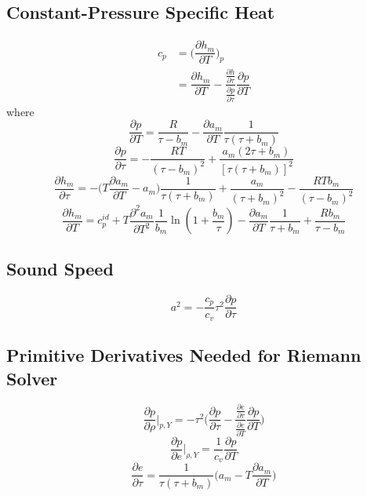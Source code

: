 \subsection{Constant-Pressure Specific Heat}
\begin{equation}
\begin{split}
c_p &= \biggl(\dfrac{\partial h_m}{\partial T}\biggr)_{p} \\
&= \dfrac{\partial h_m}{\partial T} - \dfrac{\tfrac{\partial h}{\partial \tau}}{\tfrac{\partial p}{\partial \tau}}\dfrac{\partial p}{\partial T}
\end{split}
\end{equation}
where
\begin{equation}
\frac{\partial p}{\partial T}=\frac{R}{\tau-b_m}-\frac{\partial a_m}{\partial T}\frac{1}{\tau(\tau+b_m)}
\end{equation}
\begin{equation}
\frac{\partial p}{\partial \tau}=-\frac{RT}{(\tau-b_m)^2}+\frac{a_m(2\tau+b_m)}{[\tau(\tau+b_m)]^2}
\end{equation}
\begin{equation}
\frac{\partial h_m}{\partial \tau}=-\biggl(T\frac{\partial a_m}{\partial T}-a_m\biggr)\frac{1}{\tau(\tau+b_m)}+\frac{a_m}{(\tau+b_m)^2}-\frac{RTb_m}{(\tau-b_m)^2}
\end{equation}
\begin{equation}
\frac{\partial h_m}{\partial T}=c_{p}^{id}+T\frac{\partial^2 a_m}{\partial T^2}\frac{1}{b_m}\ln(1+\frac{b_m}{\tau})-\frac{\partial a_m}{\partial T}\frac{1}{\tau +b_m}+\frac{Rb_m}{\tau-b_m}
\end{equation}

\subsection{Sound Speed}
\begin{equation}
a^2=-\frac{c_p}{c_v}\tau^2\frac{\partial p}{\partial \tau}
\end{equation}

\subsection{Primitive Derivatives Needed for Riemann Solver}
\begin{equation}
\frac{\partial p}{\partial \rho}\bigg|_{p,Y}=-\tau^2\biggl(\frac{\partial p}{\partial \tau}-\dfrac{\frac{\partial e}{\partial \tau}}{\frac{\partial e}{\partial T}}\frac{\partial p}{\partial T}\biggr)
\end{equation}
\begin{equation}
\frac{\partial p}{\partial e}\bigg|_{\rho,Y}=\frac{1}{c_v}\frac{\partial p}{\partial T}
\end{equation}
\begin{equation}
\frac{\partial e}{\partial \tau}=\frac{1}{\tau(\tau+b_m)}\biggl(a_m-T\frac{\partial a_m}{\partial T}\biggr)
\end{equation}


